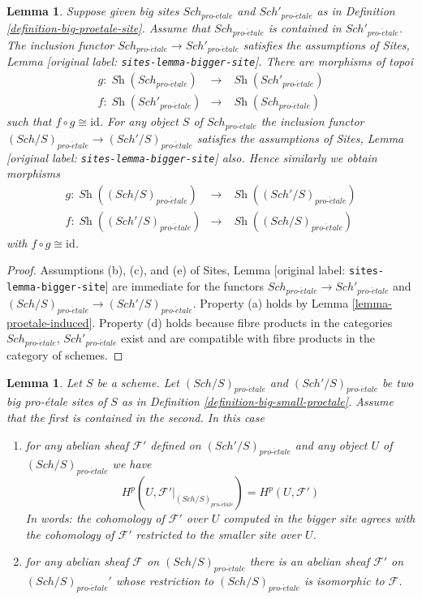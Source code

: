 \documentclass[10pt,a4paper]{article}
\theoremstyle{plain}
\newtheorem{lemma}[subsection]{Lemma}
\theoremstyle{definition}
\theoremstyle{remark}
\numberwithin{equation}{subsection}
\def\Sch{\mathit{Sch}}
\def\Sh{\mathop{\mathit{Sh}}\nolimits}
\def\proetale{{pro\text{-}\acute{e}tale}}
\begin{document}
\begin{lemma}
\label{lemma-change-alpha}
Suppose given big sites $\Sch_\proetale$ and $\Sch'_\proetale$ as in
Definition \ref{definition-big-proetale-site}.
Assume that $\Sch_\proetale$ is contained in $\Sch'_\proetale$.
The inclusion functor $\Sch_\proetale \to \Sch'_\proetale$ satisfies
the assumptions of Sites, Lemma \textnormal{[original label: \nolinkurl{sites-lemma-bigger-site}]}.
There are morphisms of topoi
\begin{eqnarray*}
g : \Sh(\Sch_\proetale) &
\longrightarrow &
\Sh(\Sch'_\proetale) \\
f : \Sh(\Sch'_\proetale) &
\longrightarrow &
\Sh(\Sch_\proetale)
\end{eqnarray*}
such that $f \circ g \cong \text{id}$. For any object $S$
of $\Sch_\proetale$ the inclusion functor
$(\Sch/S)_\proetale \to (\Sch'/S)_\proetale$ satisfies
the assumptions of Sites, Lemma \textnormal{[original label: \nolinkurl{sites-lemma-bigger-site}]}
also. Hence similarly we obtain morphisms
\begin{eqnarray*}
g : \Sh((\Sch/S)_\proetale) &
\longrightarrow &
\Sh((\Sch'/S)_\proetale) \\
f : \Sh((\Sch'/S)_\proetale) &
\longrightarrow &
\Sh((\Sch/S)_\proetale)
\end{eqnarray*}
with $f \circ g \cong \text{id}$.
\end{lemma}

\begin{proof}
Assumptions (b), (c), and (e) of
Sites, Lemma \textnormal{[original label: \nolinkurl{sites-lemma-bigger-site}]}
are immediate for the functors
$\Sch_\proetale \to \Sch'_\proetale$ and
$(\Sch/S)_\proetale \to (\Sch'/S)_\proetale$. Property (a) holds by
Lemma \ref{lemma-proetale-induced}.
Property (d) holds because
fibre products in the categories $\Sch_\proetale$, $\Sch'_\proetale$
exist and are compatible with fibre products in the category of schemes.
\end{proof}

\begin{lemma}
\label{lemma-cohomology-enlarge-partial-universe}
Let $S$ be a scheme. Let $(\Sch/S)_\proetale$ and $(\Sch'/S)_\proetale$ be two
big pro-\'etale sites of $S$ as in
Definition \ref{definition-big-small-proetale}.
Assume that the first is contained in
the second. In this case
\begin{enumerate}
\item for any abelian sheaf $\mathcal{F}'$ defined on $(\Sch'/S)_\proetale$
and any object $U$ of $(\Sch/S)_\proetale$ we have
$$
H^p(U, \mathcal{F}'|_{(\Sch/S)_\proetale}) =
H^p(U, \mathcal{F}')
$$
In words: the cohomology of $\mathcal{F}'$ over $U$ computed in the bigger site
agrees with the cohomology of $\mathcal{F}'$ restricted to the smaller site
over $U$.
\item for any abelian sheaf $\mathcal{F}$ on $(\Sch/S)_\proetale$ there is an
abelian sheaf $\mathcal{F}'$ on $(\Sch/S)_\proetale'$ whose restriction to
$(\Sch/S)_\proetale$ is isomorphic to $\mathcal{F}$.
\end{enumerate}
\end{lemma}
\end{document}
